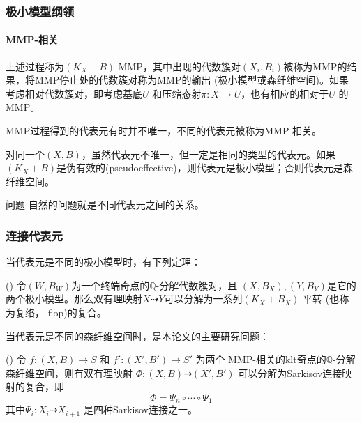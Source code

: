 \documentclass[10pt]{ctexbeamer}
\begin{document}
\begin{frame}[shrink]
  \frametitle{极小模型纲领}
  \framesubtitle{MMP-相关}

  上述过程称为$(K_{X}+B)$-MMP，其中出现的代数簇对$(X_{i},B_{i})$被称为MMP的结果，将MMP停止处的代数簇对称为MMP的输出 (极小模型或森纤维空间)。如果考虑相对代数簇对，即考虑基底$U$ 和压缩态射$\pi:X\to U$，也有相应的相对于$U$ 的MMP。

    \pause
  MMP过程得到的代表元有时并不唯一，不同的代表元被称为\alert{MMP-相关}。

    \pause
  \begin{block}{}
对同一个$(X,B)$，虽然代表元不唯一，但一定是相同的类型的代表元。如果$(K_{X}+B)$是伪有效的(pseudoeffective)，则代表元是极小模型；否则代表元是森纤维空间。
\end{block}{}
    \pause
\begin{block}{问题}
自然的问题就是不同代表元之间的关系。
\end{block}
\end{frame}




\begin{frame}[shrink]
  \frametitle{连接代表元}
当代表元是不同的极小模型时，有下列定理：
    \pause
\begin{theorem}[Kawamata](\citeauthor[Theorem 1]{flopmin})
  令$(W,B_{W})$为一个终端奇点的$\mathbb{Q}$-分解代数簇对，且 $(X,B_{X}), (Y,B_{Y})$是它的两个极小模型。那么双有理映射$X \dashrightarrow Y$可以分解为一系列$(K_{X}+B_{X})$-平转 (也称为复络， flop)的复合。
\end{theorem}
    \pause
当代表元是不同的森纤维空间时，是本论文的主要研究问题：
    \pause
  \begin{theorem}(\citeauthor[Theorem 1.1]{haconSarkisovProgram2012})\label{main}
  令 $ f:(X, B)\to S$ 和 $f':(X', B')\to S' $ 为两个 MMP-相关的klt奇点的$ \mathbb{Q} $-分解森纤维空间，则有双有理映射 $\Phi:(X,B)\dashrightarrow (X',B')$ 可以分解为Sarkisov连接映射的复合，即
  \[ \Phi=\Psi_{n}\circ \cdots \circ \Psi_{1} \]
  其中$\Psi_{i}:X_{i}\dashrightarrow X_{i+1} $ 是四种Sarkisov连接之一。
  \end{theorem}
\end{frame}
\end{document}
